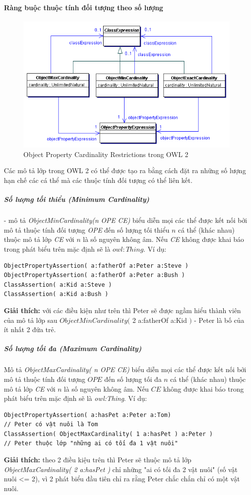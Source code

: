 \paragraph{Ràng buộc thuộc tính đối tượng theo số lượng}
\begin{figure}[h]
	\centering
	\includegraphics[width=150mm]{Figures/ce_2.png}
	\caption{Object Property Cardinality Restrictions trong OWL 2\label{overflow}}
\end{figure}
Các mô tả lớp trong OWL 2 có thể được tạo ra bằng cách đặt ra những số lượng hạn chế các cá thể mà các thuộc tính đối tượng có thể liên kết.
\subparagraph{Số lượng tối thiểu (Minimum Cardinality)} - mô tả \textit{ObjectMinCardinality(n OPE  CE)} biểu diễn mọi các thể được kết nối bởi mô tả thuộc tính đối tượng \textit{OPE} đến số lượng tối thiểu $n$ cá thể (khác nhau) thuộc mô tả lớp \textit{CE} với $n$ là số nguyên không âm. Nếu \textit{CE} không được khai báo trong phát biểu trên mặc định sẽ là $owl:Thing$. Ví dụ:
\begin{verbatim}
ObjectPropertyAssertion( a:fatherOf a:Peter a:Steve )
ObjectPropertyAssertion( a:fatherOf a:Peter a:Bush )
ClassAssertion( a:Kid a:Steve )
ClassAssertion( a:Kid a:Bush )
\end{verbatim}
\textbf{Giải thích:} với các điều kiện như trên thì Peter sẽ được ngầm hiểu thành viên của mô tả lớp sau 
$ObjectMinCardinality($ 2 a:fatherOf a:Kid $)$ - Peter là bố của ít nhất 2 đứa trẻ.

\subparagraph{Số lượng tối đa (Maximum Cardinality)} Mô tả \textit{ObjectMaxCardinality( n OPE CE)} biểu diễn mọi các thể được kết nối bởi mô tả thuộc tính đối tượng $OPE$ đến số lượng tối đa $n$ cá thể (khác nhau) thuộc mô tả lớp \textit{CE} với $n$ là số nguyên không âm. Nếu $CE$ không được khai báo trong phát biểu trên mặc định sẽ là \textit{owl:Thing}. Ví dụ:
\begin{verbatim}
ObjectPropertyAssertion( a:hasPet a:Peter a:Tom)
// Peter có vật nuôi là Tom
ClassAssertion( ObjectMaxCardinality( 1 a:hasPet ) a:Peter )
// Peter thuộc lớp "những ai có tối đa 1 vật nuôi"
\end{verbatim}
\textbf{Giải thích:} theo 2 điều kiệu trên thì Peter sẽ thuộc mô tả lớp \textit{ObjectMaxCardinality( 2 a:hasPet )} chỉ những "ai có tối đa 2 vật nuôi" (số vật nuôi <= 2), vì 2 phát biểu đầu tiên chỉ ra rằng Peter chắc chắn chỉ có một vật nuôi.

